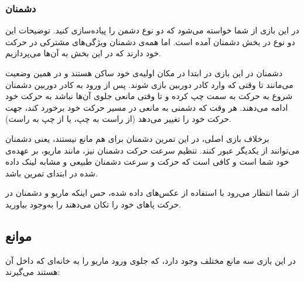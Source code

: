 \documentclass{utap}
\begin{document}
		\subsubsection{دشمنان}
در این بازی از شما خواسته می‌شود که دو نوع دشمن را پیاده‌سازی کنید. توضیحات این دو نوع در بخش دشمنان آمده است. اما همه‌ی دشمنان ویژگی‌های مشترکی در حرکت خود دارند که در این بخش به آن‌ها می‌پردازیم.

دشمنان در این بازی در ابتدا در مکان اولیه‌ی خود ساکن هستند و در همین وضعیت می‌مانند تا وقتی که وارد کادر دوربین بازی شوند. پس از ورود به کادر دوربین دشمنان شروع به حرکت به سمت چپ کرده و تا وقتی مانعی جلو‌ی آن‌ها نباشد به حرکت خود ادامه می‌دهند. هر وقت که دشمنی به مانعی در مسیر حرکت خود برخورد کند، جهت حرکت خود را تغییر می‌دهد (از راست به چپ، یا از چپ به راست).

برخلاف بازی اصلی، در این تمرین دشمنان برای هم مانع نیستند، یعنی دشمنان می‌توانند از یکدیگر عبور کنند. تنظیم سرعت حرکت دشمنان نیز، مانند ماریو، بر عهده‌ی خود شما است و کافی است که حرکت و سرعت دشمنان طبیعی و مشابه لینک داده شده در ابتدای تمرین باشد.

از شما انتظار می‌رود با استفاده از عکس‌های داده شده، حس اینکه ماریو و دشمنان در حرکت پاهای خود را تکان می‌دهند را به‌وجود بیاورید.

	\subsection{موانع}
در این بازی سه مانع مختلف وجود دارد، که جلوی ورود ماریو را به خانه‌ای که داخل آن هستند می‌گیرند:
\end{document}
